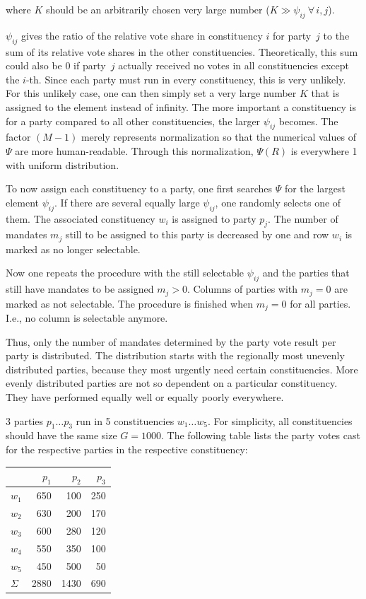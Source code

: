 where $K$ should be an arbitrarily chosen very large number ($K \gg \psi_{ij}\ \forall\,i,j$).

$\psi_{ij}$ gives the ratio of the relative vote share in constituency $i$ for party~$j$
to the sum of its relative vote shares in the other constituencies. Theoretically, this
sum could also be 0 if party~$j$ actually received no
votes in all constituencies except the $i$-th. Since each party must run in every constituency, this is very
unlikely. For this unlikely case, one can then simply set a very large number
$K$ that is assigned to the element instead of infinity. The more important a constituency is for
a party compared to all other constituencies, the larger $\psi_{ij}$ becomes. The
factor $(M-1)$ merely represents normalization so that the numerical values of $\Psi$ are more
human-readable. Through this normalization, $\Psi(R)$ is everywhere 1 with uniform distribution.

To now assign each constituency to a party, one first searches $\Psi$ for the largest element
$\psi_{ij}$. If there are several equally large $\psi_{ij}$, one randomly selects one of them.
The associated constituency $w_i$ is assigned to party $p_j$. The number of mandates $m_j$ still to be assigned to this party
is decreased by one and row $w_i$ is marked as no longer selectable.

Now one repeats the procedure with the still selectable $\psi_{ij}$ and the parties that
still have mandates to be assigned $m_j > 0$. Columns of parties with $m_j = 0$ are marked as not
selectable. The procedure is finished when $m_j = 0$ for all parties. I.e.,
no column is selectable anymore.

Thus, only the number of mandates determined by the party vote result per party is
distributed. The distribution starts with the regionally most unevenly distributed parties,
because they most urgently need certain constituencies.
More evenly distributed parties are not so dependent on a particular constituency.
They have performed equally well or equally poorly everywhere.


3 parties $p_1 \ldots p_3$ run in 5 constituencies $w_1 \ldots w_5$. For simplicity,
all constituencies should have the same size $G = 1000$. The following table lists the
party votes cast for the respective parties in the respective constituency:

\bigskip
\begin{center}
\begin{tabular}{l r r r}
  \toprule
           & $p_1$ & $p_2$ & $p_3$ \\
  \midrule
  $w_1$    & 650   & 100   & 250   \\
  $w_2$    & 630   & 200   & 170   \\
  $w_3$    & 600   & 280   & 120   \\
  $w_4$    & 550   & 350   & 100   \\
  $w_5$    & 450   & 500   & 50    \\
  \midrule
  $\Sigma$ & 2880  & 1430  & 690   \\
  \bottomrule
\end{tabular}
\end{center}
\bigskip


